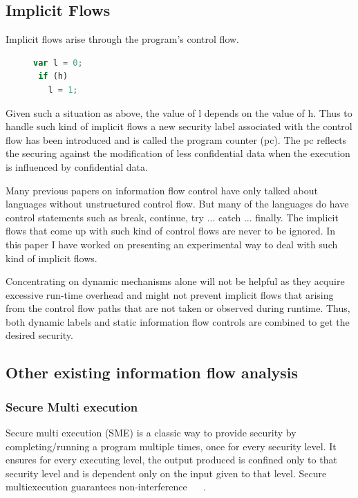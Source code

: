 \subsection{Implicit Flows}
Implicit flows arise through the program's control flow. 
\begin{figure}[h]
  \centering
\begin{lstlisting}[language=JavaScript, frame=none, numbers=none] 
 var l = 0;
 if (h) 
   l = 1;
\end{lstlisting}
\end{figure}
Given such a situation as above, the value of l depends on the value of h. Thus to handle such kind of implicit flows a new security label associated with the control flow has been introduced and is called the program counter (pc). The pc reflects the securing against the modification of less confidential data when the execution is influenced by confidential data.

Many previous papers on information flow control have only talked about languages without unstructured control flow. But many of the languages do have control statements such as break, continue, try ... catch ... finally. The implicit flows that come up with such kind of control flows are never to be ignored. In this paper I have worked on presenting an experimental way to deal with such kind of implicit flows.

Concentrating on dynamic mechanisms alone will not be helpful as they acquire excessive run-time overhead and might not prevent implicit flows that arising from the control flow paths that are not taken or observed during runtime. Thus, both dynamic labels and static information flow controls are combined to get the desired security. 

\subsection{Other existing information flow analysis}
\subsubsection{Secure Multi execution}
Secure multi execution (SME)  is a classic way to provide security by completing/running a program multiple times, once for every security level. It ensures for every executing level, the output produced is confined only to that security level and is dependent only on the input given to that level. Secure multiexecution guarantees non-interference ~\cite{multiproc1} ~\cite{secureMulti}. 

